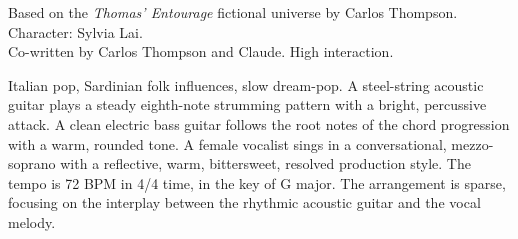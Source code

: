 

\begin{notes}
Based on the \emph{Thomas’ Entourage} fictional universe by Carlos Thompson.\\
Character: Sylvia Lai.\\
Co-written by Carlos Thompson and Claude. %
High interaction.
\end{notes}

\begin{style}
Italian pop, Sardinian folk influences, slow dream-pop. %
A steel-string acoustic guitar plays a steady eighth-note strumming pattern with a bright, percussive attack. %
A clean electric bass guitar follows the root notes of the chord progression with a warm, rounded tone. %
A female vocalist sings in a conversational, mezzo-soprano with a reflective, warm, bittersweet, resolved production style. %
The tempo is 72 BPM in 4/4 time, in the key of G major. %
The arrangement is sparse, focusing on the interplay between the rhythmic acoustic guitar and the vocal melody.
\end{style}

